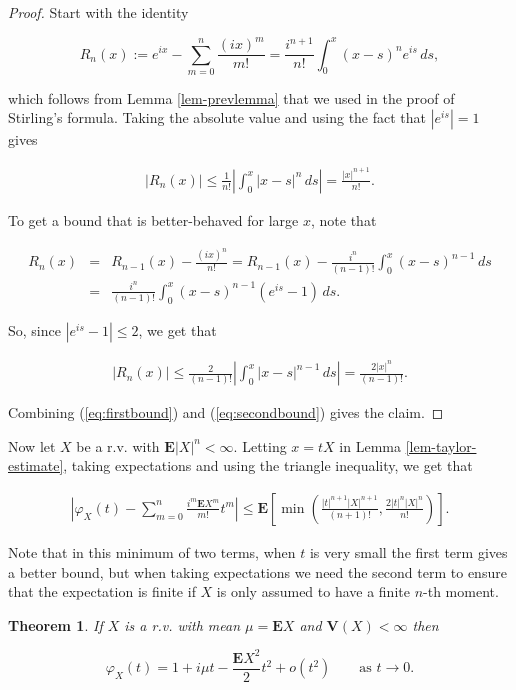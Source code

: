 \documentclass[11pt]{report}
\theoremstyle{plain}
\newtheorem{thm}{Theorem}[chapter]
\theoremstyle{definition}
\begin{document}
\begin{proof}
Start with the identity

\[
R_n(x) := e^{ix}-\sum_{m=0}^n \frac{(ix)^m}{m!} = \frac{i^{n+1}}{n!}\int_0^x(x-s)^n e^{is}\,ds,
\]

which follows from Lemma \ref{lem-prevlemma} that we
used in the proof of Stirling's formula. Taking the
absolute value and using the fact that $|e^{is}|=1$
gives

\begin{align*}
\tag{24}\label{eq:firstbound}
|R_n(x)| \le \frac{1}{n!} \left|\int_0^x |x-s|^n\,ds\right| = \frac{|x|^{n+1}}{n!}.
\end{align*}

To get a bound that is better-behaved for large $x$,
note that

\begin{eqnarray*} R_n(x) &=& R_{n-1}(x) - \frac{(ix)^n}{n!} = R_{n-1}(x) - \frac{i^n}{(n-1)!}\int_0^x (x-s)^{n-1}\,ds \\
&=& \frac{i^n}{(n-1)!}\int_0^x (x-s)^{n-1}(e^{is}-1)\,ds.
\end{eqnarray*}

So, since $|e^{is}-1|\le 2$, we get that

\begin{align*}
\tag{25}\label{eq:secondbound}
|R_n(x)| \le \frac{2}{(n-1)!} \left|\int_0^x |x-s|^{n-1}\,ds\right| = \frac{2|x|^{n}}{(n-1)!}.
\end{align*}

Combining (\ref{eq:firstbound}) and (\ref{eq:secondbound})
gives the claim.
\end{proof}

Now let $X$ be a r.v. with $\mathbf{E}|X|^n < \infty$.
Letting $x=tX$ in Lemma \ref{lem-taylor-estimate}, taking
expectations and using the triangle inequality, we get
that

\begin{align*}
\tag{26}\label{eq:taylor-expec}
\left|\varphi_X(t)-\sum_{m=0}^n \frac{i^m \mathbf{E} X^m}{m!}t^m \right| \le \mathbf{E}\left[ \min\left(
\frac{|t|^{n+1} |X|^{n+1}}{(n+1)!}, \frac{2 |t|^n |X|^n}{n!} \right) \right].
\end{align*}

Note that in this minimum of two terms, when $t$ is
very small the first term gives a better bound, but
when taking expectations we need the second term to
ensure that the expectation is finite if $X$ is only
assumed to have a finite $n$-th moment.

\begin{thm}
\label{thm-charfun-secondmoment}
If $X$ is a r.v. with mean $\mu=\mathbf{E} X$ and
$\mathbf{V}(X)<\infty$ then

\[
\varphi_X(t) = 1 + i \mu t - \frac{\mathbf{E} X^2}{2} t^2 + o(t^2) \qquad \textrm{as }t\to 0.
\]

\end{thm}
\end{document}

